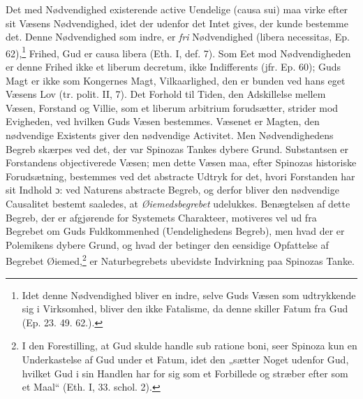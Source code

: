 \documentclass[12pt,a4paper]{book}
\newcommand{\opage}[1]{\marginnote{\footnotesize\textit{[#1]}}}
\begin{document}
\opage{66} \setcounter{footnote}{0}%
Det med Nødvendighed existerende active Uendelige (causa sui) maa
virke efter sit Væsens Nødvendighed, idet der udenfor det Intet
gives, der kunde bestemme det. Denne Nødvendighed som indre, er
\emph{fri} Nødvendighed (libera necessitas, Ep. 62),\footnote{Idet denne
Nødvendighed bliver en indre, selve Guds Væsen som udtrykkende sig
i Virksomhed, bliver den ikke Fatalisme, da denne skiller Fatum
fra Gud (Ep. 23. 49. 62.).} Frihed, Gud er causa libera (Eth. I,
def. 7). Som Eet mod Nødvendigheden er denne Frihed ikke et
liberum decretum, ikke Indifferents (jfr. Ep. 60); Guds Magt er
ikke som Kongernes Magt, Vilkaarlighed, den er bunden ved hans
eget Væsens Lov (tr. polit. II, 7). Det Forhold til Tiden, den
Adskillelse mellem Væsen, Forstand og Villie, som et liberum
arbitrium forudsætter, strider mod Evigheden, ved hvilken Guds
Væsen bestemmes. Væsenet er Magten, den nødvendige Existents
giver den nødvendige Activitet. Men Nødvendighedens Begreb
skærpes ved det, der var Spinozas Tankes dybere Grund.
Substantsen er Forstandens objectiverede Væsen; men dette Væsen
maa, efter Spinozas historiske Forudsætning, bestemmes ved det
abstracte Udtryk for det, hvori Forstanden har sit Indhold ɔ: ved
Naturens abstracte Begreb, og derfor bliver den nødvendige
Causalitet bestemt saaledes, at \emph{Øiemedsbegrebet} udelukkes.
Benægtelsen af dette Begreb, der er afgjørende for Systemets
Charakteer, motiveres vel ud fra Begrebet om Guds Fuldkommenhed
(Uendelighedens Begreb), men hvad der er Polemikens dybere Grund,
og hvad der betinger den eensidige Opfattelse af Begrebet
Øiemed,\footnote{I den Forestilling, at Gud skulde handle sub
ratione boni, seer Spinoza kun en Underkastelse af Gud under et
Fatum, idet den „sætter Noget udenfor Gud, hvilket Gud i sin
Handlen har for sig som et Forbillede og stræber efter som et
Maal“ (Eth. I, 33. schol. 2).} er Naturbegrebets ubevidste
Indvirkning paa Spinozas Tanke.
\end{document}
